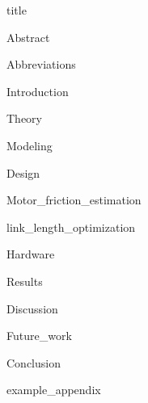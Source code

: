 \documentclass{article}
\begin{document}
{title}

\frontmatter

{Abstract}


\newpage
\tableofcontents

\listoffigures
\listoftables

\mainmatter
{Abbreviations}

{Introduction}
\newpage

{Theory}

{Modeling}

{Design}

{Motor_friction_estimation}

{link_length_optimization}

{Hardware}


{Results}

{Discussion}

{Future_work}

{Conclusion}


\newpage
\printbibliography[heading = bibintoc, title = Bibliography]    %

\addappendix
{example_appendix}

\end{document}
